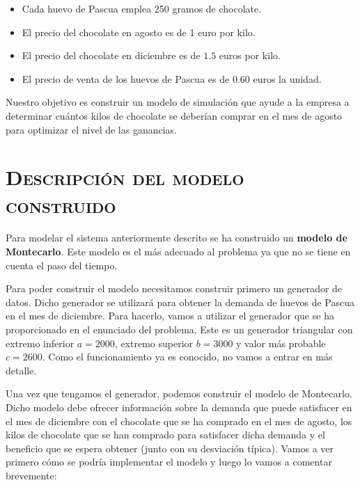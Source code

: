 \documentclass[11pt,a4paper]{article}
\begin{document}
\begin{itemize}[label=\textbullet]
	\item Cada huevo de Pascua emplea 250 gramos de chocolate.
	\item El precio del chocolate en agosto es de 1 euro por kilo.
	\item El precio del chocolate en diciembre es de $1.5$ euros por kilo.
	\item El precio de venta de los huevos de Pascua es de $0.60$ euros la unidad.
\end{itemize}

Nuestro objetivo es construir un modelo de simulación que ayude a la empresa a determinar
cuántos kilos de chocolate se deberían comprar en el mes de agosto para optimizar el nivel
de las ganancias.

\section{\textsc{Descripción del modelo construido}}

Para modelar el sistema anteriormente descrito se ha construido un \textbf{modelo de Montecarlo}.
Este modelo es el más adecuado al problema ya que no se tiene en cuenta el paso del tiempo.

Para poder construir el modelo necesitamos construir primero un generador de datos. Dicho generador
se utilizará para obtener la demanda de huevos de Pascua en el mes de diciembre. Para hacerlo, vamos
a utilizar el generador que se ha proporcionado en el enunciado del problema. Este es un generador
triangular con extremo inferior $a = 2000$, extremo superior $b = 3000$ y valor más probable
$c = 2600$. Como el funcionamiento ya es conocido, no vamos a entrar en más detalle.

Una vez que tengamos el generador, podemos construir el modelo de Montecarlo. Dicho modelo debe
ofrecer información sobre la demanda que puede satisfacer en el mes de diciembre con el chocolate
que se ha comprado en el mes de agosto, los kilos de chocolate que se han comprado para satisfacer
dicha demanda y el beneficio que se espera obtener (junto con su desviación típica). Vamos a ver primero
cómo se podría implementar el modelo y luego lo vamos a comentar brevemente:
\end{document}
